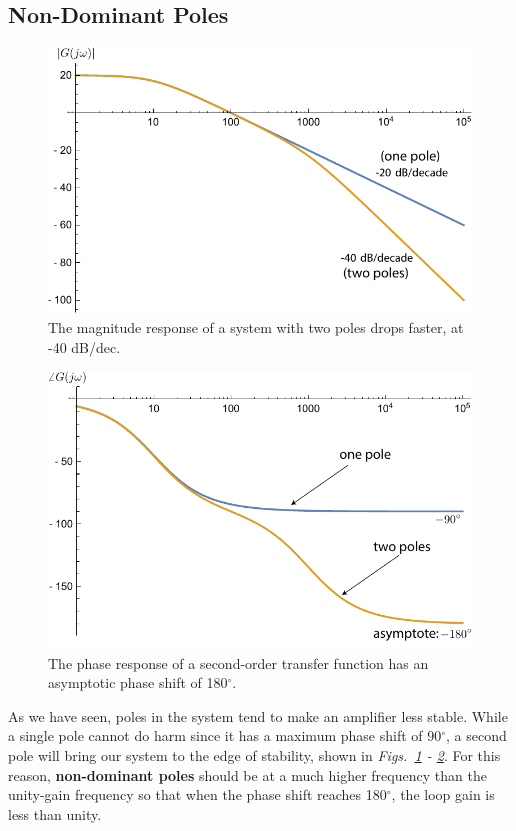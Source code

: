 \subsection{Non-Dominant Poles}
\begin{figure}[tb]
\centering
\includegraphics[width=.7\columnwidth]{mag2pole}
\caption{The magnitude response of a system with two poles drops faster, at -40 dB/dec.} \label{fig:mag2pole}
\end{figure}
\begin{figure}[tb]
\centering
\includegraphics[width=.7\columnwidth]{phase2pole}
\caption{The phase response of a second-order transfer function has an asymptotic phase shift of 180$^\circ$.} \label{fig:phase2pole}
\end{figure}
As we have seen, poles in the system tend to make an amplifier less stable. While a single pole cannot do harm since it has a maximum phase shift of 90$^\circ$, a second pole will bring our system to the edge of stability, shown in \emph{Figs.~\ref{fig:mag2pole} - \ref{fig:phase2pole}}.   For this reason, \textbf{non-dominant poles} should be at a much higher frequency than the unity-gain frequency so that when the phase shift reaches 180$^\circ$, the loop gain is less than unity.
